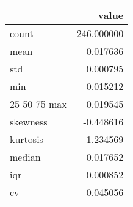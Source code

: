 \begin{tabular}{lr}
\toprule
 & value \\
\midrule
count & 246.000000 \\
mean & 0.017636 \\
std & 0.000795 \\
min & 0.015212 \\
25%
50%
75%
max & 0.019545 \\
skewness & -0.448616 \\
kurtosis & 1.234569 \\
median & 0.017652 \\
iqr & 0.000852 \\
cv & 0.045056 \\
\bottomrule
\end{tabular}

